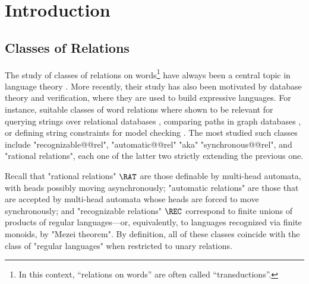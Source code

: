 \section{Introduction}
\label{sec:dichotomy-introduction}


\subsection{Classes of Relations}

The study of classes of relations on words\footnote{In this context, ``relations on words''
are often called ``transductions''.} have always been a central topic in language theory
\cite{ElgotMezi1965RelationsGeneralizedAutomata,Nivat1968TransductionChomsky,Berstel1979Transductions,FrougnySakarovitch1993SynchronizedRationalRelations,Choffrut2006Survey}. 
More recently, their study has also been motivated by database theory and verification,
where they are used to build expressive languages. For instance,
suitable classes of word relations where shown to be relevant for querying strings over relational 
databases \cite{BenediktLibkinSchwentickSegoufin2003DefinableRelations}, comparing paths in graph databases \cite{BarceloLibkinLinWood2012ExpressiveLanguages}, or defining  
string constraints for model checking \cite{LinBarcelo2016StringSolvingWordEquationsTransducers}. 
The most studied such classes include "recognizable@@rel", "automatic@@rel" "aka" "synchronous@@rel", and "rational relations", each one of the latter two strictly extending the previous one. 

Recall that \AP"rational relations" $\RAT$
are those definable by multi-head automata,
with heads possibly moving asynchronously;
"automatic relations"
are those that are accepted by multi-head automata
whose heads are forced to move synchronously; and 
\AP"recognizable relations" $\REC$ correspond to finite unions of products of regular languages---or, equivalently, to languages recognized via finite monoids, by "Mezei theorem".
By definition, all of these classes coincide with the 
class of "regular languages" when restricted to unary relations.


